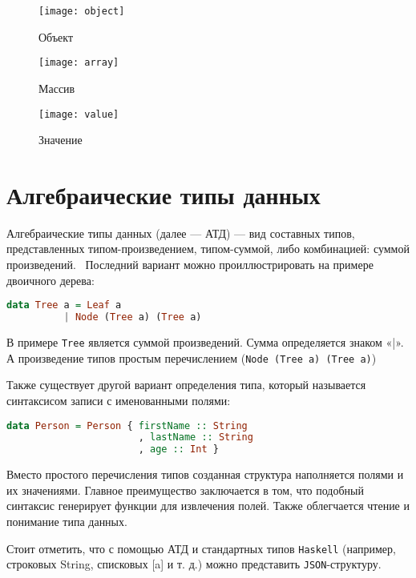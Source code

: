 \begin{figure}[!ht]
\centering
\texttt{[image: object]}
\caption{\label{fig:objectGr}Объект}
\end{figure}

\begin{figure}[!ht]
\centering
\texttt{[image: array]}
\caption{\label{fig:arrayGr}Массив}
\end{figure}

\begin{figure}[!ht]
\centering
\texttt{[image: value]}
\caption{\label{fig:valueGr}Значение}
\end{figure}

\section{Алгебраические типы данных}

Алгебраические типы данных (далее --- АТД) --- вид составных типов, представленных типом-произведением, типом-суммой, либо комбинацией: суммой произведений.~\cite{haskellGreatGood} Последний вариант можно проиллюстрировать на примере двоичного дерева:

\begin{lstlisting}[language=Haskell]
data Tree a = Leaf a
          | Node (Tree a) (Tree a)
\end{lstlisting}
В примере \lstinline{Tree} является суммой произведений. Сумма определяется знаком «|». А произведение типов простым перечислением (\lstinline{Node (Tree a) (Tree a)}) 

Также существует другой вариант определения типа, который называется синтаксисом записи с именованными полями:

\begin{lstlisting}[language=Haskell]
data Person = Person { firstName :: String
                       , lastName :: String
                       , age :: Int }
\end{lstlisting}

Вместо простого перечисления типов созданная структура наполняется полями и их значениями. Главное преимущество заключается в том, что подобный синтаксис генерирует функции для извлечения полей. Также облегчается чтение и понимание типа данных. 

Стоит отметить, что с помощью АТД и стандартных типов \lstinline{Haskell} (например, строковых String, списковых [a] и т. д.) можно представить \lstinline{JSON}-структуру. 

